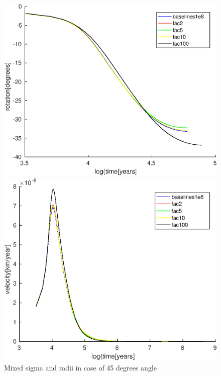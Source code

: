 \documentclass[12pt]{scrreprt}
\begin{document}
\begin{figure}[ht!]
	\begin{minipage}[t]{1.0\textwidth}	
		\begin{minipage}[t]{0.5\textwidth}
		\includegraphics[width=1.0\textwidth]{./Snapshots/slab45s1e8mixedsigma_rot.eps}
		\end{minipage}
		\begin{minipage}[t]{0.5\textwidth}
		\includegraphics[width=1.0\textwidth]{./Snapshots/slab45s1e8mixedsigma_vel.eps}
		\end{minipage}
	\end{minipage}
	\caption{Mixed sigma and radii in case of 45 degrees angle}
	\label{fig:mixsigma45}
\end{figure}
\end{document}
